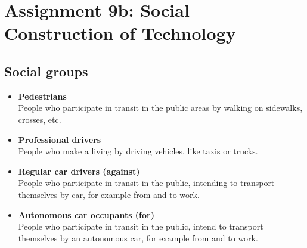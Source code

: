 \section*{Assignment 9b: Social Construction of Technology} 

\subsection*{Social groups}
\begin{itemize}
    \item \textbf{Pedestrians}\\
    People who participate in transit in the public areas by walking on sidewalks, crosses, etc.

    \item \textbf{Professional drivers}\\
    People who make a living by driving vehicles, like taxis or trucks.

    \item \textbf{Regular car drivers (against)}\\
    People who participate in transit in the public, intending to transport themselves by car, for example from and to work.

    \item \textbf{Autonomous car occupants (for)}\\
    People who participate in transit in the public, intend to transport themselves by an autonomous car, for example from and to work.
    
\end{itemize}

